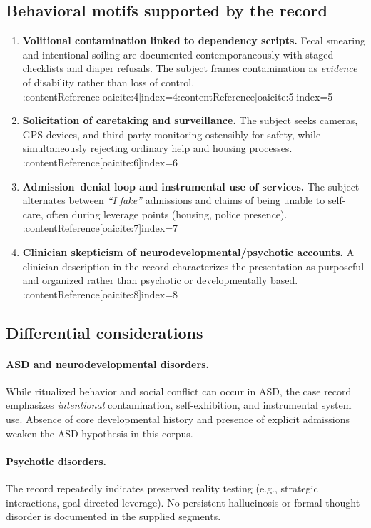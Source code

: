 \documentclass[12pt]{article}
\begin{document}
\subsection{Behavioral motifs supported by the record}
\begin{enumerate}[label=\textbf{F\arabic*.}, leftmargin=2em]
  \item \textbf{Volitional contamination linked to dependency scripts.} Fecal smearing and intentional soiling are documented contemporaneously with staged checklists and diaper refusals. The subject frames contamination as \emph{evidence} of disability rather than loss of control. :contentReference[oaicite:4]{index=4}:contentReference[oaicite:5]{index=5}
  \item \textbf{Solicitation of caretaking and surveillance.} The subject seeks cameras, GPS devices, and third-party monitoring ostensibly for safety, while simultaneously rejecting ordinary help and housing processes. :contentReference[oaicite:6]{index=6}
  \item \textbf{Admission–denial loop and instrumental use of services.} The subject alternates between \emph{``I fake''} admissions and claims of being unable to self-care, often during leverage points (housing, police presence). :contentReference[oaicite:7]{index=7}
  \item \textbf{Clinician skepticism of neurodevelopmental/psychotic accounts.} A clinician description in the record characterizes the presentation as purposeful and organized rather than psychotic or developmentally based. :contentReference[oaicite:8]{index=8}
\end{enumerate}

\subsection{Differential considerations}
\paragraph{ASD and neurodevelopmental disorders.} While ritualized behavior and social conflict can occur in ASD, the case record emphasizes \emph{intentional} contamination, self-exhibition, and instrumental system use. Absence of core developmental history and presence of explicit admissions weaken the ASD hypothesis in this corpus.

\paragraph{Psychotic disorders.} The record repeatedly indicates preserved reality testing (e.g., strategic interactions, goal-directed leverage). No persistent hallucinosis or formal thought disorder is documented in the supplied segments.
\end{document}
